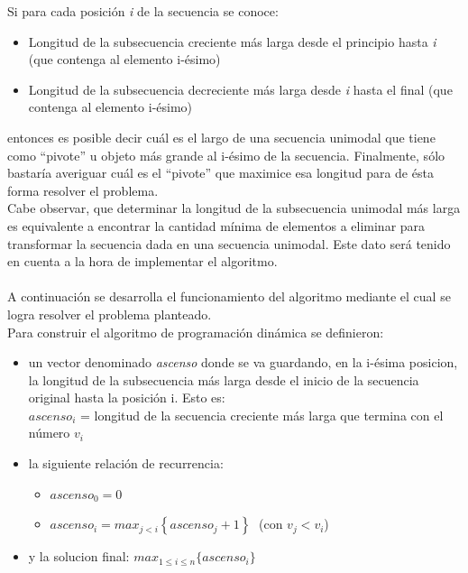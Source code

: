Si para cada posición \textit{i} de la secuencia se conoce:
\begin{itemize}
	\item Longitud de la subsecuencia creciente más larga desde el principio hasta \textit{i} (que contenga al elemento i-ésimo)
	\item Longitud de la subsecuencia decreciente más larga desde \textit{i} hasta el final (que contenga al elemento i-ésimo)
\end{itemize}

entonces es posible decir cuál es el largo de una secuencia unimodal que tiene como ``pivote'' u objeto más grande al i-ésimo de la secuencia. Finalmente, sólo bastaría averiguar cuál es el ``pivote'' que maximice esa longitud para de ésta forma resolver el problema.\\
Cabe observar, que determinar la longitud de la subsecuencia unimodal más larga es equivalente a encontrar la cantidad mínima de elementos a eliminar para transformar la secuencia dada en una secuencia unimodal. Este dato será tenido en cuenta a la hora de implementar el algoritmo.

\paragraph{}
A continuación se desarrolla el funcionamiento del algoritmo mediante el cual se logra resolver el problema planteado.\\

Para construir el algoritmo de programación dinámica se definieron:
\begin{itemize}
	\item un vector denominado \textit{ascenso} donde se va guardando, en la i-ésima posicion, la longitud de la subsecuencia más larga desde el inicio de la secuencia original hasta la posición i. Esto es: \\ $ascenso_i$ = longitud de la secuencia creciente más larga que termina con el número $v_i$
	\item la siguiente relación de recurrencia:	 
	\begin{itemize} 
		\item $ascenso_0 = 0$
		\item $ascenso_i  = max_{j<i} \left\lbrace ascenso_j + 1\right\rbrace  \;      $ (con $ v_j < v_i  $)
	\end{itemize}
	\item y la solucion final: $max_{1\leq i\leq n} \{ascenso_i\}$
\end{itemize}

